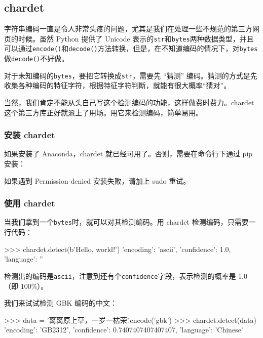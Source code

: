\hypertarget{chardet}{%
\subsection{chardet}\label{chardet}}

字符串编码一直是令人非常头疼的问题，尤其是我们在处理一些不规范的第三方网页的时候。虽然
Python 提供了 Unicode
表示的\texttt{str}和\texttt{bytes}两种数据类型，并且可以通过\texttt{encode()}和\texttt{decode()}方法转换，但是，在不知道编码的情况下，对\texttt{bytes}做\texttt{decode()}不好做。

对于未知编码的\texttt{bytes}，要把它转换成\texttt{str}，需要先 ``猜测''
编码。猜测的方式是先收集各种编码的特征字符，根据特征字符判断，就能有很大概率``猜对''。

当然，我们肯定不能从头自己写这个检测编码的功能，这样做费时费力。chardet
这个第三方库正好就派上了用场。用它来检测编码，简单易用。

\hypertarget{ux5b89ux88c5-chardet}{%
\subsubsection{安装 chardet}\label{ux5b89ux88c5-chardet}}

如果安装了 Anaconda，chardet 就已经可用了。否则，需要在命令行下通过 pip
安装：


如果遇到 Permission denied 安装失败，请加上 sudo 重试。

\hypertarget{ux4f7fux7528-chardet}{%
\subsubsection{使用 chardet}\label{ux4f7fux7528-chardet}}

当我们拿到一个\texttt{bytes}时，就可以对其检测编码。用 chardet
检测编码，只需要一行代码：

\begin{pythoncode}
>>> chardet.detect(b'Hello, world!')
{'encoding': 'ascii', 'confidence': 1.0, 'language': ''}
\end{pythoncode}

检测出的编码是\texttt{ascii}，注意到还有个\texttt{confidence}字段，表示检测的概率是
1.0（即 100\%）。

我们来试试检测 GBK 编码的中文：

\begin{pythoncode}
>>> data = '离离原上草，一岁一枯荣'.encode('gbk')
>>> chardet.detect(data)
{'encoding': 'GB2312', 'confidence': 0.7407407407407407, 'language': 'Chinese'}
\end{pythoncode}

